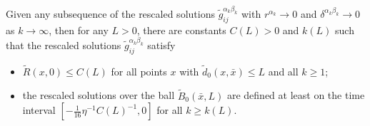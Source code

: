 \begin{lemma}
  \label{lem:cz-rescaled-balls-uniform-curvature-backward-existence}
Given any subsequence of the rescaled
solutions $\tilde{g}^{\alpha_k\beta_k}_{ij}$ with
$r^{\alpha_k}\rightarrow 0$ and
$\delta^{\alpha_k\beta_k}\rightarrow 0$ as $k\rightarrow \infty$,
then for any $L>0$, there are constants $C(L)>0$ and $k(L)$ such
that the rescaled solutions $\tilde{g}^{\alpha_k\beta_k}_{ij}$
satisfy
\begin{itemize}
\item[(i)] $\tilde{R}(x,0)\leq C(L)$ for all points $x$ with
$\tilde{d}_{0}(x,\bar{x})\leq L$ and all $k \geq 1$; \item[(ii)]
the rescaled solutions over the ball $\tilde{B}_{0}(\bar{x},L)$
are defined at least on the time interval
$[-\frac{1}{16}\eta^{-1}C(L)^{-1},0]$ for all $k\geq k(L)$.
\end{itemize}

\end{lemma}
